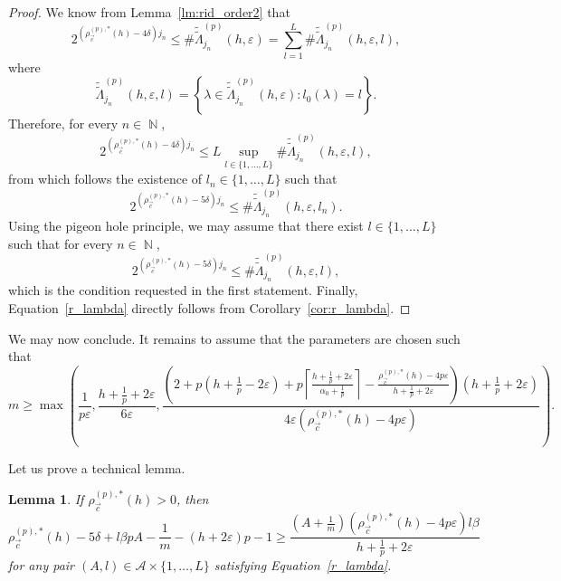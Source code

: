 \documentclass[a4paper,11pt,oneside]{article}
\DeclareMathOperator{\N}{\mathbb{N}}
\theoremstyle{definition}
\theoremstyle{plain}
\newtheorem{lemma}[defi]{Lemma}
\begin{document}
\begin{proof}
We know from Lemma~\ref{lm:rid_order2} that
\[
2^{(\rho_{\vec{c}}^{(p),\ast}(h)-4\delta)j_n} 
\leq \#\widetilde{\widetilde{\Lambda}}_{j_n}^{(p)}(h,\varepsilon) = \sum_{l=1}^L \#\widetilde{\widetilde{\Lambda}}_{j_n}^{(p)}(h,\varepsilon,l),
\]
where
\[
\widetilde{\widetilde{\Lambda}}_{j_n}^{(p)}(h,\varepsilon,l)=\left\{\lambda\in\widetilde{\widetilde{\Lambda}}_{j_n}^{(p)}(h,\varepsilon):l_0(\lambda)=l\right\}.
\]
Therefore, for every $n\in\N$,
\[
2^{(\rho_{\vec{c}}^{(p),\ast}(h)-4\delta)j_n}\leq L\sup_{l\in\{1,\ldots,L\}}\#\widetilde{\widetilde{\Lambda}}_{j_n}^{(p)}(h,\varepsilon,l),
\]
from which follows the existence of $l_n\in\{1,\ldots,L\}$ such that
\[
2^{(\rho_{\vec{c}}^{(p),\ast}(h)-5\delta)j_n}\leq\#\widetilde{\widetilde{\Lambda}}_{j_n}^{(p)}(h,\varepsilon,l_n).
\]
Using the pigeon hole principle, 
we may assume that there exist $l\in\{1,\ldots,L\}$ such that for every $n\in\N$, 
\[
2^{(\rho_{\vec{c}}^{(p),\ast}(h)-5\delta)j_n}\leq \#\widetilde{\widetilde{\Lambda}}_{j_n}^{(p)}(h,\varepsilon,l),
\]
which is the condition requested in the first statement. Finally, Equation~\eqref{r_lambda} directly follows from Corollary~\ref{cor:r_lambda}.
\end{proof}

We may now conclude. It remains to assume that the parameters are chosen such that
\footnotesize\begin{equation}\label{eq:m}
    m\geq \max\left(\frac{1}{p\varepsilon},\frac{h+\frac{1}{p}+2\varepsilon}{6\varepsilon},\frac{\left(2+p\left(h+\frac{1}{p}-2\varepsilon\right)+p\left\lceil\frac{h+\frac{1}{p}+2\varepsilon}{\alpha_0+\frac{1}{p}}\right\rceil-\frac{\rho_{\vec{c}}^{(p),\ast}(h)-4p\varepsilon}{h+\frac{1}{p}+2\varepsilon}\right)\left(h+\frac{1}{p}+2\varepsilon\right)}{4\varepsilon(\rho_{\vec{c}}^{(p),\ast}(h)-4p\varepsilon)}\right).
\end{equation}\normalsize

Let us prove a technical lemma.

\begin{lemma}\label{lm:tech}
If $\rho_{\vec{c}}^{(p),\ast}(h)>0$, then 
\[
\rho_{\vec{c}}^{(p),\ast}(h)-5\delta+l\beta pA-\frac{1}{m}-(h+2\varepsilon)p-1\geq \frac{\left(A+\frac{1}{m}\right)(\rho_{\vec{c}}^{(p),\ast}(h)-4p\varepsilon)l\beta}{h+\frac{1}{p}+2\varepsilon}
\]
for any pair $(A,l)\in\mathcal{A}\times\{1,\ldots,L\}$ satisfying Equation~\eqref{r_lambda}.
\end{lemma}
\end{document}
